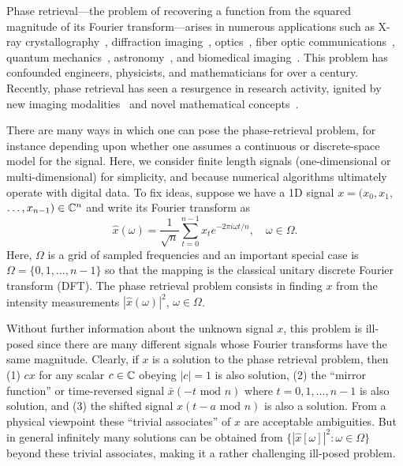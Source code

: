 Phase retrieval---the problem of recovering a function from the squared
magnitude of its Fourier transform---arises in numerous applications such as X-ray crystallography~\cite{Mil90,Har93}, diffraction imaging~\cite{GS72}, optics~\cite{Walther_phaseretrievaloptics}, fiber optic communications~\cite{chou2022phase}, quantum mechanics~\cite{Cor06}, astronomy~\cite{DF87},
and biomedical imaging~\cite{dierolf2010ptychographic}.
This problem has confounded engineers, physicists, and mathematicians for over a century. 
Recently, phase retrieval has seen a resurgence in research activity, ignited by new imaging modalities~\cite{neutze2000potential,chapman2007femtosecond} and novel mathematical concepts~\cite{CESV2013,FS2020}. 

There are many ways in which one can pose the phase-retrieval problem,
for instance depending upon whether one assumes a continuous or
discrete-space model for the signal. Here, we consider finite
length signals (one-dimensional or multi-dimensional) for simplicity,
and because numerical algorithms ultimately operate with digital data.
To fix ideas, suppose we have a 1D signal
$x = (x_0, x_1,$ $\ldots, x_{n-1}) \in \mathbb{C}^n$ and write its Fourier transform as
\begin{equation}
  \label{eq:fourier}
  {\hat x}(\omega) =
  \frac{1}{\sqrt{n}} \sum_{t=0}^{n-1} x_t e^{-2\pi i\omega t/n},
\quad \omega \in \Omega.
\end{equation}
Here, $\Omega$ is a grid of sampled frequencies and an important
special case is $\Omega = \{0,1, \ldots, n-1\}$ so that the mapping is
the classical unitary discrete Fourier transform (DFT).   
 The phase retrieval
problem consists in finding $x$ from the intensity measurements
$|{\hat x}(\omega)|^2$, $\omega \in \Omega$.  

Without further information about the
unknown signal $x$, this problem is ill-posed since there are many
different signals whose Fourier transforms have the same
magnitude. Clearly, if $x$ is a solution to the phase retrieval
problem, then (1) $c x$ for any scalar $c \in \mathbb{C}$ obeying $|c| = 1$ is
also solution, (2) the ``mirror function'' or time-reversed signal
$\bar{x}(-t \text{ mod } n)$ where $t = 0,1, \ldots, n-1$ is also
solution, and (3) the shifted signal $x(t - a \text{ mod } n)$ is also
a solution. From a physical viewpoint these ``trivial associates'' of
$x$ are acceptable ambiguities. But in general infinitely many
solutions can be obtained from $\{|\hat{x}[\omega]|^2 : \omega \in
\Omega\}$ beyond these trivial associates, making it a rather challenging ill-posed problem. 



